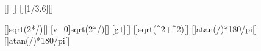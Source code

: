 [\mpss]
[\m]
[\kmph][1/3.6][\mps]

[]{sqrt(2*\hfX/\gEX)}[\s]
[v_0]{\vflX*sqrt(2*\hfX/\gEX)}[\m]
[g\,t]{\gEX*\tfX}[\mps]
[]{sqrt(\vflX^2+\vyfX^2)}[\mps]
[\arctan{}]{atan(\vflX/\vyfX)*180/pi}[\degree]
[\arctan{}]{atan(\vyfX/\vflX)*180/pi}[\degree]
